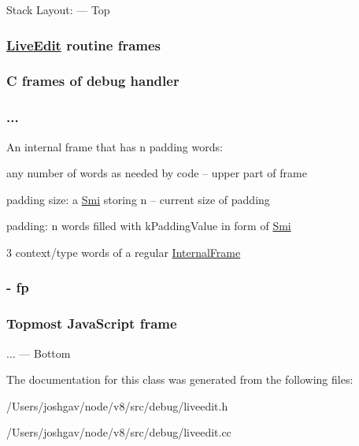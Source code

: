 Stack Layout\+: --- Top \subsubsection*{\hyperlink{classv8_1_1internal_1_1_live_edit}{Live\+Edit} routine frames }

\subsubsection*{C frames of debug handler }

\subsubsection*{... }

An internal frame that has n padding words\+:
\begin{DoxyItemize}
\item any number of words as needed by code -- upper part of frame
\item padding size\+: a \hyperlink{classv8_1_1internal_1_1_smi}{Smi} storing n -- current size of padding
\item padding\+: n words filled with k\+Padding\+Value in form of \hyperlink{classv8_1_1internal_1_1_smi}{Smi}
\item 3 context/type words of a regular \hyperlink{classv8_1_1internal_1_1_internal_frame}{Internal\+Frame} \subsubsection*{-\/ fp }
\end{DoxyItemize}

\subsubsection*{Topmost Java\+Script frame }

... --- Bottom 

The documentation for this class was generated from the following files\+:\begin{DoxyCompactItemize}
\item 
/\+Users/joshgav/node/v8/src/debug/liveedit.\+h\item 
/\+Users/joshgav/node/v8/src/debug/liveedit.\+cc\end{DoxyCompactItemize}
